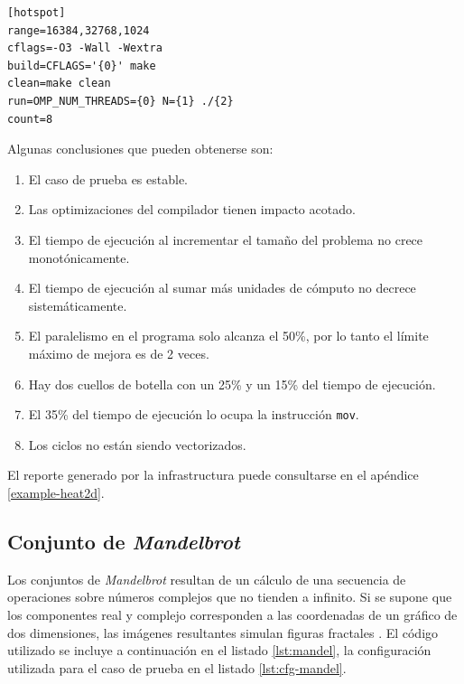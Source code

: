\documentclass[a4paper]{report}
\begin{document}
\bigskip

\begin{lstlisting}[caption={Caso de Prueba de Distribución de Calor en 2 Dimensiones},label={lst:cfg-heat}]
[hotspot]
range=16384,32768,1024
cflags=-O3 -Wall -Wextra
build=CFLAGS='{0}' make
clean=make clean
run=OMP_NUM_THREADS={0} N={1} ./{2}
count=8
\end{lstlisting}

\bigskip

Algunas conclusiones que pueden obtenerse son:

\begin{enumerate}
\item El caso de prueba es estable.
\item Las optimizaciones del compilador tienen impacto acotado.
\item El tiempo de ejecución al incrementar el tamaño del problema no crece monotónicamente.
\item El tiempo de ejecución al sumar más unidades de cómputo no decrece sistemáticamente.
\item El paralelismo en el programa solo alcanza el 50\%, por lo tanto el límite máximo de mejora es de 2 veces.
\item Hay dos cuellos de botella con un 25\% y un 15\% del tiempo de ejecución.
\item El 35\% del tiempo de ejecución lo ocupa la instrucción {\tt mov}.
\item Los ciclos no están siendo vectorizados.
\end{enumerate}

El reporte generado por la infrastructura puede consultarse en el apéndice \ref{example-heat2d}.

\subsection{Conjunto de {\it Mandelbrot}}

Los conjuntos de {\it Mandelbrot} resultan de un cálculo de una secuencia de operaciones sobre números complejos que no tienden a infinito.
Si se supone que los componentes real y complejo corresponden a las coordenadas de un gráfico de dos dimensiones, las imágenes resultantes simulan figuras fractales \cite{mandel}.
El código utilizado se incluye a continuación en el listado \ref{lst:mandel}, la configuración utilizada para el caso de prueba en el listado \ref{lst:cfg-mandel}.

\bigskip
\end{document}

